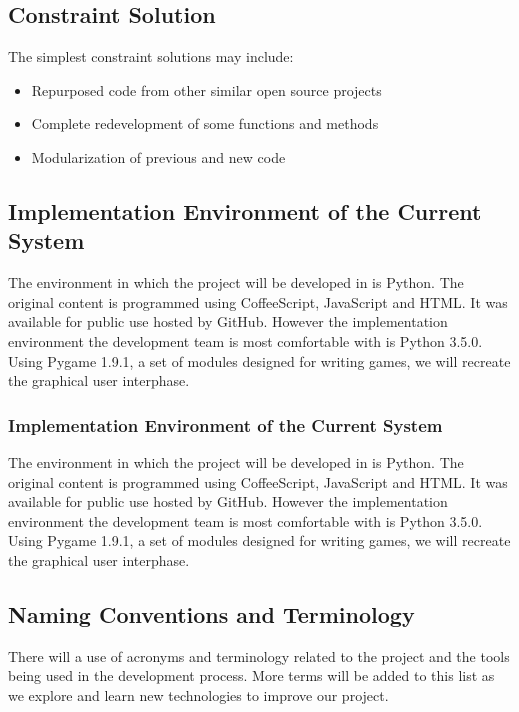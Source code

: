 \documentclass[12pt]{article}
\begin{document}
\subsection{Constraint Solution}
 The simplest constraint solutions may include:
 \begin{itemize}
  \item Repurposed code from other similar open source projects
  \item Complete redevelopment of some functions and methods
  \item Modularization of previous and new code
 \end{itemize}
  \subsection{Implementation Environment of the Current System}
 The environment in which the project will be developed in is Python. The original content is programmed using CoffeeScript, JavaScript and HTML. It was available for public use hosted by GitHub. However the implementation environment the development team is most comfortable with is Python 3.5.0. Using Pygame 1.9.1, a set of modules designed for writing games, we will recreate the graphical user interphase.
\subsubsection{Implementation Environment of the Current System}
 The environment in which the project will be developed in is Python. The original content is programmed using CoffeeScript, JavaScript and HTML. It was available for public use hosted by GitHub. However the implementation environment the development team is most comfortable with is Python 3.5.0. Using Pygame 1.9.1, a set of modules designed for writing games, we will recreate the graphical user interphase.

\subsection{Naming Conventions and Terminology}
There will a use of acronyms and terminology related to the project and the tools being used in the development process. More terms will be added to this list as we explore and learn new technologies to improve our project. 
\end{document}

